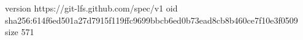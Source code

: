 version https://git-lfs.github.com/spec/v1
oid sha256:614f6ed501a27d7915f119ffc9699bbcb6ed0b73ead8cb8b460ce7f10e3f0509
size 571
